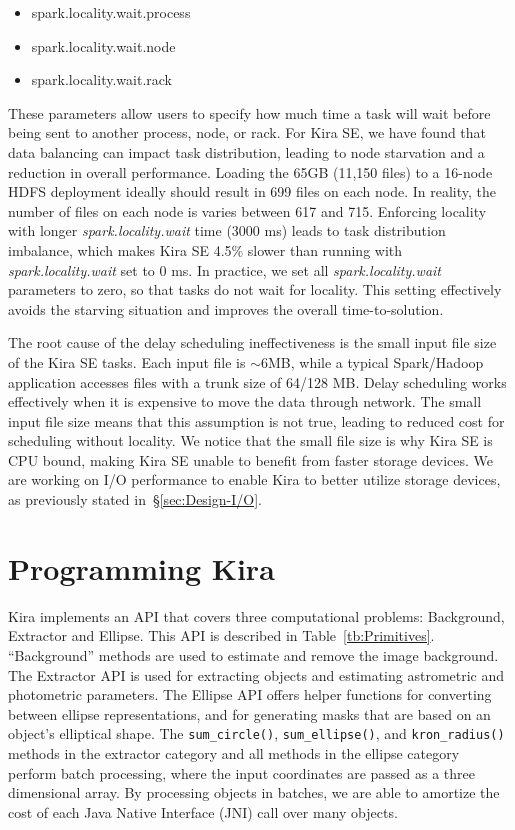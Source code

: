\documentclass[10pt, conference, compsocconf]{IEEEtran}
\begin{document}
\begin{itemize}
\item{spark.locality.wait.process}
\item{spark.locality.wait.node}
\item{spark.locality.wait.rack}
\end{itemize}

These parameters allow users to specify how much time a task will wait before being sent to another
process, node, or rack. For Kira SE, we have found that data balancing can 
impact task distribution, leading to node starvation and a reduction in overall performance.
Loading the 65GB (11,150 files) to a 16-node HDFS deployment ideally should result in 699 files on each node.
In reality, the number of files on each node is varies between 617 and 715.
Enforcing locality with longer {\em spark.locality.wait} time (3000 ms) leads to task distribution imbalance, which makes
Kira SE 4.5\% slower than running with {\em spark.locality.wait} set to 0 ms.
In practice, we set all {\em spark.locality.wait} parameters to zero, so that tasks do not wait for locality.
This setting effectively avoids the starving situation and improves the overall time-to-solution.

The root cause of the delay scheduling ineffectiveness is the small input file size of the Kira SE tasks. 
Each input file is $\sim$6MB, while a typical Spark/Hadoop application accesses files with a trunk size of 64/128 MB.
Delay scheduling works effectively when it is expensive to move the data through network. The small input
file size means that this assumption is not true, leading to reduced cost for scheduling without locality.
We notice that the small file size is why Kira SE is CPU bound, making Kira SE
unable to benefit from faster storage devices. 
We are working on I/O performance to enable Kira to better utilize storage devices, as previously stated in~\S\ref{sec:Design-I/O}.
 
\section{Programming Kira}
\label{sec:Programming}
Kira implements an API that covers three computational problems: Background, Extractor and Ellipse. This API is described
in Table~\ref{tb:Primitives}. ``Background'' methods are used to estimate and remove the image background. The Extractor
API is used for extracting objects and estimating astrometric and photometric parameters. The Ellipse API offers helper
functions for converting between ellipse representations, and for generating masks that are based on an object's elliptical
shape. The \texttt{sum\_circle()}, \texttt{sum\_ellipse()}, and \texttt{kron\_radius()} methods in the extractor category and all
methods in the ellipse category perform batch processing, where the input coordinates are passed as a three dimensional array. By processing objects
in batches, we are able to amortize the cost of each Java Native Interface (JNI) call over many objects.
\end{document}
